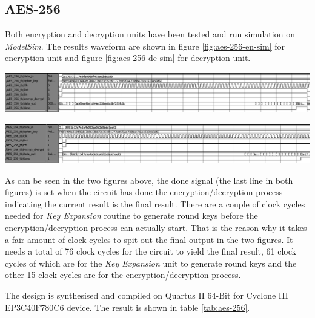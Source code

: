 \documentclass[a4paper, 10pt]{article}
\newenvironment{Figure}
    {\par\medskip\noindent\minipage{\linewidth}}
    {\endminipage\par\medskip}
\begin{document}
\begin{multicols}{2}
        \subsection{AES-256}

	Both encryption and decryption units have been tested and run simulation on \textit{ModelSim}. The results waveform are shown in figure \ref{fig:aes-256-en-sim} for encryption unit and figure \ref{fig:aes-256-de-sim} for decryption unit.

	\begin{Figure}
                \centering
                \includegraphics[width=\linewidth]{aes-256-encryption-waveform-edited.png}
                \label{fig:aes-256-en-sim}
            \end{Figure}

	\begin{Figure}
                \centering
                \includegraphics[width=\linewidth]{aes-256-decryption-waveform-edited.png}
                \label{fig:aes-256-de-sim}
            \end{Figure}

	As can be seen in the two figures above, the done signal (the last line in both figures) is set when the circuit has done the encryption/decryption process indicating the current result is the final result. There are a couple of clock cycles needed for \textit{Key Expansion} routine to generate round keys before the encryption/decryption process can actually start. That is the reason why it takes a fair amount of clock cycles to spit out the final output in the two figures. It needs a total of 76 clock cycles for the circuit to yield the final result, 61 clock cycles of which are for the \textit{Key Expansion} unit to generate round keys and the other 15 clock cycles are for the encryption/decryption process.

	The design is synthesised and compiled on Quartus II 64-Bit for Cyclone III EP3C40F780C6 device. The result is shown in table \ref{tab:aes-256}.


\end{multicols}
\end{document}
